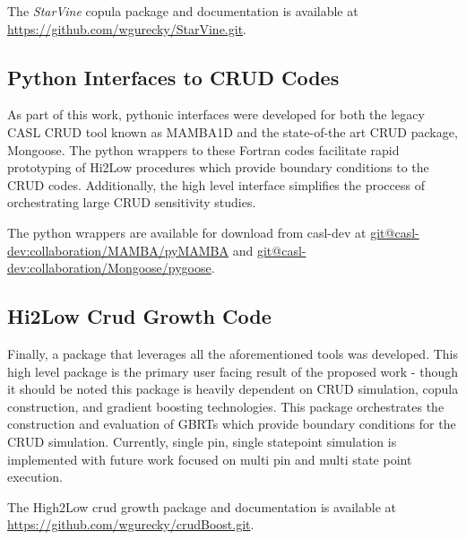 The \emph{StarVine} copula package and documentation is available at \url{https://github.com/wgurecky/StarVine.git}.

\subsection{Python Interfaces to CRUD Codes}

As part of this work, pythonic interfaces were developed for both the legacy CASL CRUD tool known as MAMBA1D and the state-of-the art CRUD package, Mongoose.  The python wrappers to these Fortran codes facilitate rapid prototyping of Hi2Low procedures which provide boundary conditions to the CRUD codes.  Additionally, the high level interface simplifies the proccess of orchestrating large CRUD sensitivity studies.

The python wrappers are available for download from casl-dev at \url{git@casl-dev:collaboration/MAMBA/pyMAMBA} and \url{git@casl-dev:collaboration/Mongoose/pygoose}.

\subsection{Hi2Low Crud Growth Code}

Finally, a package that leverages all the aforementioned tools was developed.  This high level package is the primary user facing result of the proposed work - though it should be noted this package is heavily dependent on CRUD simulation, copula construction, and gradient boosting technologies.
This package orchestrates the construction and evaluation of GBRTs which provide boundary conditions for the CRUD simulation.
Currently, single pin, single statepoint simulation is implemented with future work focused on multi pin and multi state point execution.

The High2Low crud growth package and documentation is available at \url{https://github.com/wgurecky/crudBoost.git}.
